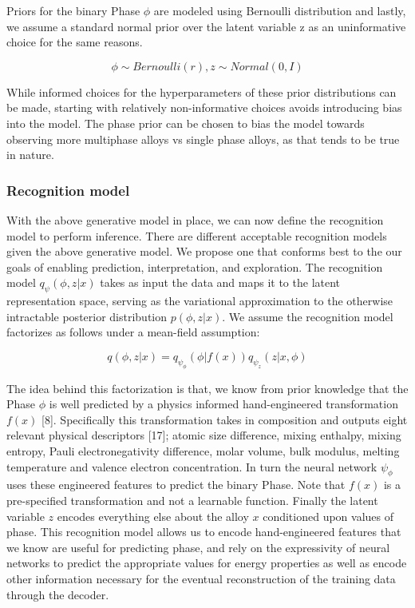 \documentclass[a4paper]{article}
\begin{document}
Priors for the binary Phase $\phi$ are modeled using Bernoulli distribution and lastly, we assume a standard normal prior over the latent variable z as an uninformative choice for the same reasons.

\begin{equation}
    \phi \sim Bernoulli(r), z \sim Normal(0, I)
\end{equation}

While informed choices for the hyperparameters of these prior distributions can be made, starting with relatively non-informative choices  avoids introducing bias into the model. The phase prior can be chosen to bias the model towards observing more multiphase alloys vs single phase alloys, as that tends to be true in nature.

\subsubsection{Recognition model}

With the above generative model in place, we can now define the recognition model to perform inference. There are different acceptable recognition models given the above generative model. We propose one that conforms best to the our goals of enabling prediction, interpretation, and exploration. The recognition model $q_\psi(\phi, z | x)$  takes as input the data and maps it to the latent representation space, serving as the variational approximation to the otherwise intractable posterior distribution $p(\phi, z | x)$. We assume the recognition model factorizes as follows under a mean-field assumption:

\begin{equation}
    q(\phi, z | x)=q_{\psi_\phi}(\phi | f(x)) q_{\psi_z}(z|x, \phi)
\end{equation}

The idea behind this factorization is that, we know from prior knowledge that the Phase $\phi$ is well predicted by a physics informed hand-engineered transformation $f(x)$ [8]. Specifically this transformation takes in composition and outputs eight relevant physical descriptors [17]; atomic size difference, mixing enthalpy, mixing entropy, Pauli electronegativity difference, molar volume, bulk modulus, melting temperature and valence electron concentration. In turn the neural network $\psi_\phi$ uses these engineered features to predict the binary Phase. Note that $f(x)$ is a pre-specified transformation and not a learnable function. Finally the latent variable $z$ encodes everything else about the alloy $x$ conditioned upon values of phase. This recognition model allows us to encode hand-engineered features that we know are useful for predicting phase, and rely on the expressivity of neural networks to predict the appropriate values for energy properties as well as encode other information necessary for the eventual reconstruction of the training data through the decoder.
\end{document}
